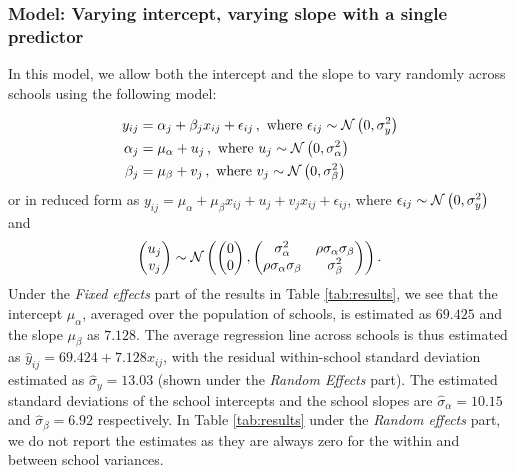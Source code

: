 \subsubsection*{Model: Varying intercept, varying slope with a single predictor}
\label{subsubsection:model}
In this model, we allow both the intercept and the slope to vary randomly across schools using the following model:

\begin{align}
	y_{ij} &= \alpha_j + \beta_j x_{ij} +\epsilon_{ij} \,, \text{ where } \epsilon_{ij} \sim \mathcal{N}\left(0, \sigma_y^2\right) \\
	\alpha_j &= \mu_\alpha + u_j \,, \text{ where } u_j \sim \mathcal{N}\left(0, \sigma_\alpha^2\right)  \\
	\beta_j &= \mu_\beta + v_j \,, \text{ where } v_j \sim \mathcal{N}\left(0, \sigma_\beta^2\right)
\end{align}
or in reduced form as $y_{ij} = \mu_\alpha + \mu_\beta x_{ij} + u_j + v_j x_{ij} + \epsilon_{ij}$, where $\epsilon_{ij} \sim \mathcal{N}\left(0,\sigma_{y}^{2}\right)$ and
\begin{align}
	\left( \begin{matrix} u_j \\ v_j \end{matrix} \right) \sim \mathcal{N}\left( \left( \begin{matrix} 0 \\ 0 \end{matrix} \right) ,\left( \begin{matrix} { \sigma  }_{ \alpha  }^{ 2 } & \rho { \sigma  }_{ \alpha  }{ \sigma  }_{ \beta  } \\ \rho { \sigma  }_{ \alpha  }{ \sigma  }_{ \beta  } & { \sigma  }_{ \beta  }^{ 2 } \end{matrix} \right)\right).
\end{align}
Under the \textit{Fixed effects} part of the results in Table \ref{tab:results}, we see that the intercept $\mu_{\alpha}$, averaged over the population of schools, is estimated as $69.425$ and the slope $\mu_{\beta}$ as $7.128$. The average regression line across schools is thus estimated as $\hat{y}_{ij} = 69.424 + 7.128 x_{ij}$, with the residual within-school standard deviation estimated as $\hat{\sigma}_{y}=13.03$ (shown under the \textit{Random Effects} part). The estimated standard deviations of the school intercepts and the school slopes are $\hat{\sigma}_{\alpha}= 10.15$ and $\hat{\sigma}_{\beta}=6.92$ respectively. In Table \ref{tab:results} under the \textit{Random effects} part, we do not report the estimates as they are always zero for the within and between school variances.

